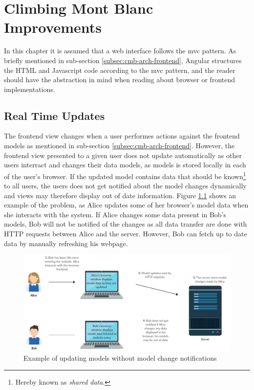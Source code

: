 \chapter{Climbing Mont Blanc Improvements}
\label{ch:improvements}

In this chapter it is assumed that a web interface follows the \gls{mvc} pattern. As briefly mentioned in sub-section \ref{subsec:cmb-arch-frontend}, Angular structures the HTML and Javascript code according to the \gls{mvc} pattern, and the reader should have the abstraction in mind when reading about browser or frontend implementations.

\section{Real Time Updates}
\label{sec:real-time}
The frontend view changes when a user performes actions against the frontend models as mentioned in sub-section \ref{subsec:cmb-arch-frontend}. However, the frontend view presented to a given user does not update automatically as other users interract and changes their data models, as models is stored locally in each of the user's browser. If the updated model contains data that should be known\footnote{Hereby known as \textit{shared data}.} to all users, the users does not get notified about the model changes dynamically and views may therefore display out of date information. Figure \ref{fig:update-problem} shows an example of the problem, as Alice updates some of her browser's model data when she interacts with the system. If Alice changes some data present in Bob's models, Bob will not be notified of the changes as all data transfer are done with HTTP requests between Alice and the server. However, Bob can fetch up to date data by manually refreshing his webpage. \\

\begin{figure}
    \centering
    \includegraphics[width=1\textwidth]{figs/update_problem.jpg}
    \caption{Example of updating models without model change notifications}
    \label{fig:update-problem}
\end{figure}

